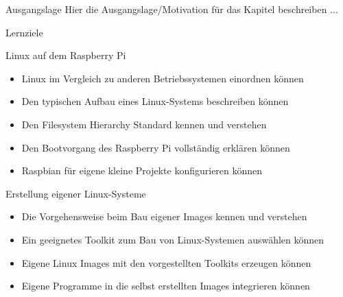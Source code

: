 \begin{frame}{Ausgangslage}
    Hier die Ausgangslage/Motivation für das Kapitel beschreiben ...

\end{frame}

\begin{frame}{Lernziele}
    \begin{block}{Linux auf dem Raspberry Pi}
        \begin{itemize}
            \item Linux im Vergleich zu anderen Betriebssystemen einordnen können
            \item Den typischen Aufbau eines Linux-Systems beschreiben können
            \item Den Filesystem Hierarchy Standard kennen und verstehen
            \item Den Bootvorgang des Raspberry Pi vollständig erklären können
            \item Raspbian für eigene kleine Projekte konfigurieren können
        \end{itemize}
    \end{block}

    \begin{block}{Erstellung eigener Linux-Systeme}
        \begin{itemize}
            \item Die Vorgehensweise beim Bau eigener Images kennen und verstehen
            \item Ein geeignetes Toolkit zum Bau von Linux-Systemen auswählen können
            \item Eigene Linux Images mit den vorgestellten Toolkits erzeugen können
            \item Eigene Programme in die selbst erstellten Images integrieren können
        \end{itemize}
    \end{block}
\end{frame}

